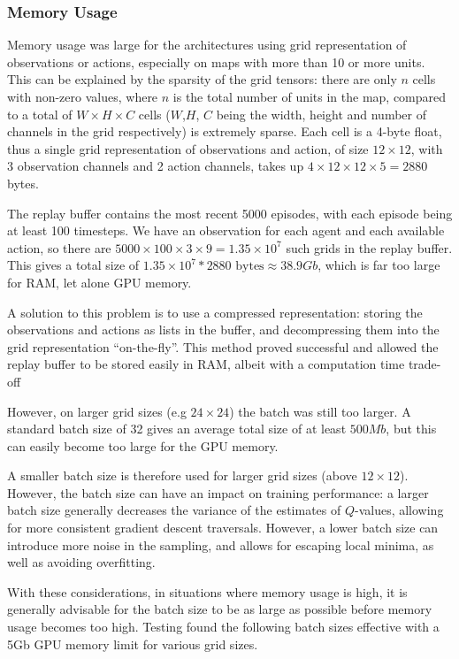 \subsubsection{Memory Usage}

Memory usage was large for the architectures using grid representation of observations or actions, especially on maps with more than 10 or more units. This can be explained by the sparsity of the grid tensors: there are only $n$ cells with non-zero values, where $n$ is the total number of units in the map, compared to a total of $W \times H \times C$ cells ($W$,$H$, $C$ being the width, height and number of channels in the grid respectively) is extremely sparse. Each cell is a 4-byte float, thus a single grid representation of observations and action, of size $12 \times 12$, with 3 observation channels and 2 action channels, takes up $4 \times 12 \times 12 \times 5 = 2880$ bytes. 

The replay buffer contains the most recent 5000 episodes, with each episode being at least 100 timesteps. We have an observation for each agent and each available action, so there are $5000 \times 100 \times 3 \times 9 = 1.35 \times 10^7$ such grids in the replay buffer. This gives a total size of $1.35 \times 10^7 * 2880 \text{ bytes} \approx 38.9Gb$, which is far too large for RAM, let alone GPU memory.


A solution to this problem is to use a compressed representation: storing the observations and actions as lists in the buffer, and decompressing them into the grid representation ``on-the-fly''. This method proved successful and allowed the replay buffer to be stored easily in RAM, albeit with a computation time trade-off

However, on larger grid sizes (e.g $24\times24$) the batch was still too larger. A standard batch size of 32 \cite{smac} gives an average total size of at least $500Mb$, but this can easily become too large for the GPU memory. 

A smaller batch size is therefore used for larger grid sizes (above $12 \times 12$). However, the batch size can have an impact on training performance: a larger batch size generally decreases the variance of the estimates of $Q$-values, allowing for more consistent gradient descent traversals. However, a lower batch size can introduce more noise in the sampling, and allows for escaping local minima, as well as avoiding overfitting.

With these considerations, in situations where memory usage is high, it is generally advisable for the batch size to be as large as possible before memory usage becomes too high. Testing found the following batch sizes effective with a 5Gb GPU memory limit for various grid sizes.

